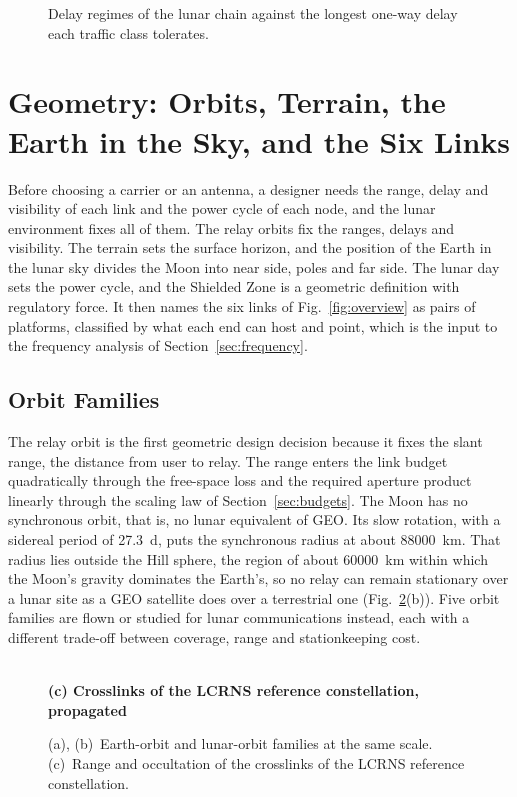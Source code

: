 \documentclass{IEEEoj}
\begin{document}
\begin{figure}[!t]
\centering
\resizebox{\textwidth}{!}{}
\caption{Delay regimes of the lunar chain against the longest one-way delay each traffic class tolerates.}
\label{fig:delay}
\end{figure}


\section{Geometry: Orbits, Terrain, the Earth in the Sky, and the Six Links}
\label{sec:geometry}
Before choosing a carrier or an antenna, a designer needs the range, delay and visibility of each link and the power cycle of each node, and the lunar environment fixes all of them. The relay orbits fix the ranges, delays and visibility. The terrain sets the surface horizon, and the position of the Earth in the lunar sky divides the Moon into near side, poles and far side. The lunar day sets the power cycle, and the Shielded Zone is a geometric definition with regulatory force. It then names the six links of Fig.~\ref{fig:overview} as pairs of platforms, classified by what each end can host and point, which is the input to the frequency analysis of Section~\ref{sec:frequency}.

\subsection{Orbit Families}
\label{sec:orbitfam}
The relay orbit is the first geometric design decision because it fixes the slant range, the distance from user to relay. The range enters the link budget quadratically through the free-space loss and the required aperture product linearly through the scaling law of Section~\ref{sec:budgets}. The Moon has no synchronous orbit, that is, no lunar equivalent of GEO. Its slow rotation, with a sidereal period of \SI{27.3}{d}, puts the synchronous radius at about \SI{88000}{km}. That radius lies outside the Hill sphere, the region of about \SI{60000}{km} within which the Moon's gravity dominates the Earth's, so no relay can remain stationary over a lunar site as a GEO satellite does over a terrestrial one (Fig.~\ref{fig:orbits}(b)). Five orbit families are flown or studied for lunar communications instead, each with a different trade-off between coverage, range and stationkeeping cost.

\begin{figure}[t]
\centering
\resizebox{\textwidth}{!}{}\\[4pt]
{\sffamily\footnotesize\bfseries (c) Crosslinks of the LCRNS reference constellation, propagated}\\[2pt]

\caption{(a), (b)~Earth-orbit and lunar-orbit families at the same scale. (c)~Range and occultation of the crosslinks of the LCRNS reference constellation.}
\label{fig:orbits}
\end{figure}
\end{document}
